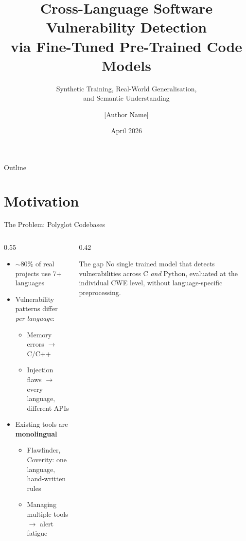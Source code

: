 \documentclass[aspectratio=169]{beamer}
\title[Cross-Language Vulnerability Detection]{%
  Cross-Language Software Vulnerability Detection\\
  via Fine-Tuned Pre-Trained Code Models}
\subtitle{Synthetic Training, Real-World Generalisation,\\and Semantic Understanding}
\author{[Author Name]}
\institute{University Dissertation}
\date{April 2026}
\begin{document}
\begin{frame}
  \titlepage
\end{frame}

\begin{frame}{Outline}
  \tableofcontents
\end{frame}

\section{Motivation}

\begin{frame}{The Problem: Polyglot Codebases}
  \begin{columns}
    \begin{column}{0.55\textwidth}
      \begin{itemize}
        \item $\sim$80\% of real projects use 7+ languages
        \item Vulnerability patterns differ \emph{per language}:
          \begin{itemize}
            \item Memory errors $\to$ C/C++
            \item Injection flaws $\to$ every language, different APIs
          \end{itemize}
        \item Existing tools are \textbf{monolingual}
          \begin{itemize}
            \item Flawfinder, Coverity: one language, hand-written rules
            \item Managing multiple tools $\to$ alert fatigue
          \end{itemize}
      \end{itemize}
    \end{column}
    \begin{column}{0.42\textwidth}
      \begin{block}{The gap}
        No single trained model that detects vulnerabilities
        across C \emph{and} Python, evaluated at the individual
        CWE level, without language-specific preprocessing.
      \end{block}
    \end{column}
  \end{columns}
\end{frame}
\end{document}
